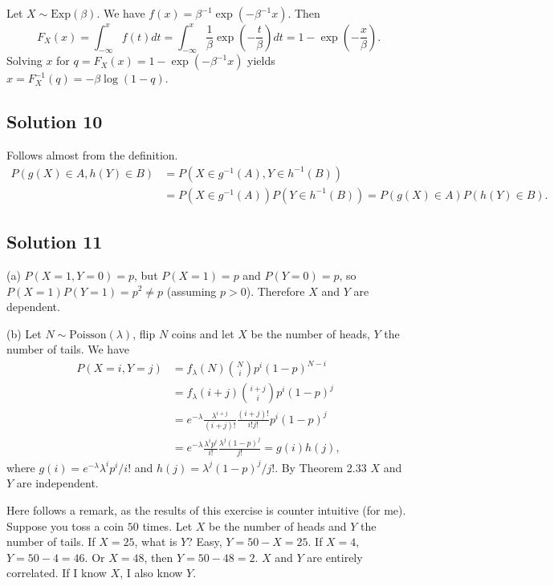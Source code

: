 Let $X \sim \mathrm{Exp}(\beta)$.
We have $f(x) = \beta^{-1} \exp(-\beta^{-1}x)$.
Then
$$
F_X(x) = \int_{-\infty}^x f(t)dt
    = \int_{-\infty}^x \frac{1}{\beta} \exp\left(-\frac{t}{\beta}\right) dt
    = 1 - \exp\left(-\frac{x}{\beta}\right).
$$
Solving $x$ for $q = F_X(x) = 1 - \exp(-\beta^{-1}x)$ yields $x = F_X^{-1}(q) = -\beta \log(1 - q)$.


\subsection*{Solution 10}

Follows almost from the definition.
\begin{equation*}
\begin{split}
P(g(X) \in A, h(Y) \in B)
    &= P(X \in g^{-1}(A), Y \in h^{-1}(B)) \\
    &= P(X \in g^{-1}(A)) P(Y \in h^{-1}(B))
    = P(g(X) \in A) P(h(Y) \in B).
\end{split}
\end{equation*}


\subsection*{Solution 11}

(a) $P(X = 1, Y = 0) = p$, but $P(X = 1) = p$ and $P(Y = 0) = p$, so $P(X = 1)P(Y = 1) = p^2 \neq p$ (assuming $p > 0$).
Therefore $X$ and $Y$ are dependent.

(b) Let $N \sim \mathrm{Poisson}(\lambda)$, flip $N$ coins and let $X$ be the number of heads, $Y$ the number of tails.
We have
\begin{equation*}
\begin{split}
P(X = i, Y = j)
    &= f_{\lambda}(N) \binom{N}{i} p^i (1 - p)^{N - i} \\
    &= f_{\lambda}(i + j) \binom{i + j}{i} p^i (1 - p)^j \\
    &= e^{-\lambda} \frac{\lambda^{i + j}}{(i + j)!} \frac{(i + j)!}{i! j!} p^i (1 - p)^j \\
    &= e^{-\lambda} \frac{\lambda^i p^i}{i!} \frac{\lambda^j (1 - p)^j}{j!} = g(i) h(j),
\end{split}
\end{equation*}
where $g(i) = e^{-\lambda} \lambda^i p^i / i!$ and $h(j) = \lambda^j (1 - p)^j / j!$.
By Theorem 2.33 $X$ and $Y$ are independent.

Here follows a remark, as the results of this exercise is counter intuitive (for me).
Suppose you toss a coin $50$ times.
Let $X$ be the number of heads and $Y$ the number of tails.
If $X = 25$, what is $Y$? Easy, $Y = 50 - X = 25$.
If $X = 4$, $Y = 50 - 4 = 46$.
Or $X = 48$, then $Y = 50 - 48 = 2$.
$X$ and $Y$ are entirely correlated.
If I know $X$, I also know $Y$.

